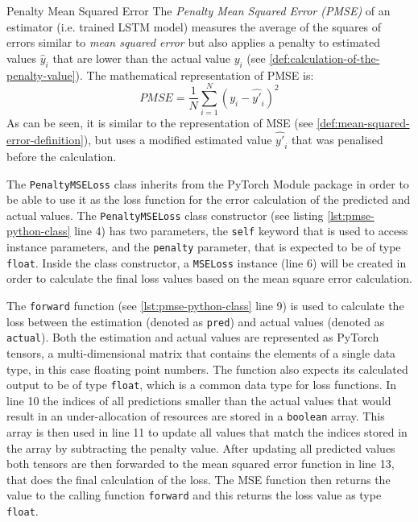     \begin{pabox}{Penalty Mean Squared Error}
      \label{def:penalty-mean-squared-error-definition}
      The \emph{Penalty Mean Squared Error (PMSE)} of an estimator (i.e. trained LSTM model) measures the average of the squares of errors similar to \emph{mean squared error} but also applies a penalty to estimated values $\hat{y}_i$ that are lower than the actual value $y_i$ (see \ref{def:calculation-of-the-penalty-value}). 
      The mathematical representation of PMSE is:
      $$PMSE = \frac{1}{N} \sum_{i = 1}^{N}\left(y_i - \hat{y'}_i\right)^2$$
      As can be seen, it is similar to the representation of MSE (see \ref{def:mean-squared-error-definition}), but uses a modified estimated value $\hat{y'}_i$ that was penalised before the calculation.
    \end{pabox}

    The \texttt{PenaltyMSELoss} class inherits from the PyTorch Module package in order to be able to use it as the loss function for the error calculation of the predicted and actual values.
    The \texttt{PenaltyMSELoss} class constructor (see listing \ref{lst:pmse-python-class} line 4) has two parameters, the \texttt{self} keyword that is used to access instance parameters, and the \texttt{penalty} parameter, that is expected to be of type \texttt{float}.
    Inside the class constructor, a \texttt{MSELoss} instance (line 6) will be created in order to calculate the final loss values based on the mean square error calculation.

    The \texttt{forward} function (see \ref{lst:pmse-python-class} line 9) is used to calculate the loss between the estimation (denoted as \texttt{pred}) and actual values (denoted as \texttt{actual}). Both the estimation and actual values are represented as PyTorch tensors, a multi-dimensional matrix that contains the elements of a single data type, in this case floating point numbers.
    The function also expects its calculated output to be of type \texttt{float}, which is a common data type for loss functions.
    In line 10 the indices of all predictions smaller than the actual values that would result in an under-allocation of resources are stored in a \texttt{boolean} array.
    This array is then used in line 11 to update all values that match the indices stored in the array by subtracting the penalty value.
    After updating all predicted values both tensors are then forwarded to the mean squared error function in line 13, that does the final calculation of the loss.
    The MSE function then returns the value to the calling function \texttt{forward} and this returns the loss value as type \texttt{float}.

    


